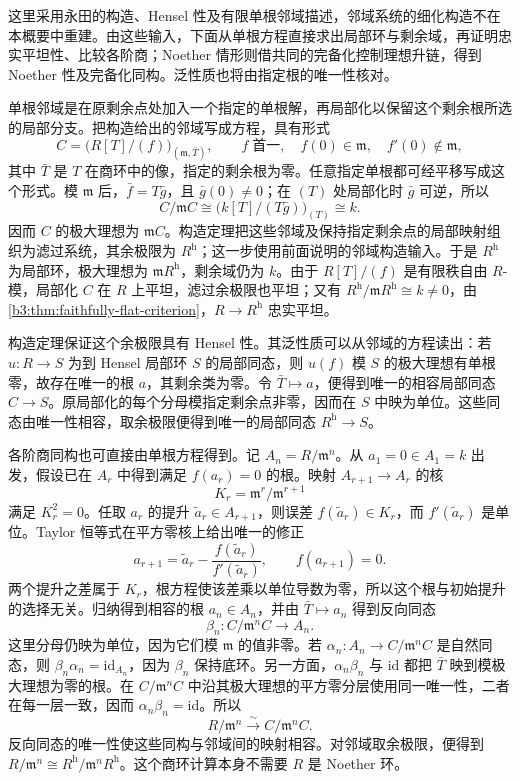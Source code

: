 \begin{proofsketch}
	这里采用永田的构造、Hensel 性及有限单根邻域描述，邻域系统的细化构造不在本概要中重建。由这些输入，下面从单根方程直接求出局部环与剩余域，再证明忠实平坦性、比较各阶商；Noether 情形则借共同的完备化控制理想升链，得到 Noether 性及完备化同构。泛性质也将由指定根的唯一性核对。

	单根邻域是在原剩余点处加入一个指定的单根解，再局部化以保留这个剩余根所选的局部分支。把构造给出的邻域写成方程，具有形式
	\[
		C=\bigl(R[T]/(f)\bigr)_{(\mathfrak m,\bar T)}, \qquad f\;\text{首一},\quad f(0)\in\mathfrak m, \quad f'(0)\notin\mathfrak m,
	\]
	其中 \(\bar T\) 是 \(T\) 在商环中的像，指定的剩余根为零。任意指定单根都可经平移写成这个形式。模 \(\mathfrak m\) 后，\(\bar f=T\bar g\)，且 \(\bar g(0)\ne0\)；在 \((T)\) 处局部化时 \(\bar g\) 可逆，所以
	\[
		C/\mathfrak mC\cong \bigl(k[T]/(T\bar g)\bigr)_{(T)}\cong k.
	\]
	因而 \(C\) 的极大理想为 \(\mathfrak mC\)。构造定理把这些邻域及保持指定剩余点的局部映射组织为滤过系统，其余极限为 \(R^{\mathrm h}\)；这一步使用前面说明的邻域构造输入。于是 \(R^{\mathrm h}\) 为局部环，极大理想为 \(\mathfrak mR^{\mathrm h}\)，剩余域仍为 \(k\)。由于 \(R[T]/(f)\) 是有限秩自由 \(R\)-模，局部化 \(C\) 在 \(R\) 上平坦，滤过余极限也平坦；又有 \(R^{\mathrm h}/\mathfrak mR^{\mathrm h}\cong k\ne0\)，由\cref{b3:thm:faithfully-flat-criterion}，\(R\to R^{\mathrm h}\) 忠实平坦。

	构造定理保证这个余极限具有 Hensel 性。其泛性质可以从邻域的方程读出：若 \(u:R\to S\) 为到 Hensel 局部环 \(S\) 的局部同态，则 \(u(f)\) 模 \(S\) 的极大理想有单根零，故存在唯一的根 \(a\)，其剩余类为零。令 \(\bar T\mapsto a\)，便得到唯一的相容局部同态 \(C\to S\)。原局部化的每个分母模指定剩余点非零，因而在 \(S\) 中映为单位。这些同态由唯一性相容，取余极限便得到唯一的局部同态 \(R^{\mathrm h}\to S\)。

	各阶商同构也可直接由单根方程得到。记 \(A_n=R/\mathfrak m^n\)。从 \(a_1=0\in A_1=k\) 出发，假设已在 \(A_r\) 中得到满足 \(f(a_r)=0\) 的根。映射 \(A_{r+1}\to A_r\) 的核
	\[
		K_r=\mathfrak m^r/\mathfrak m^{r+1}
	\]
	满足 \(K_r^2=0\)。任取 \(a_r\) 的提升 \(\tilde a_r\in A_{r+1}\)，则误差 \(f(\tilde a_r)\in K_r\)，而 \(f'(\tilde a_r)\) 是单位。Taylor 恒等式在平方零核上给出唯一的修正
	\[
		a_{r+1}=\tilde a_r- \dfrac{f(\tilde a_r)}{f'(\tilde a_r)}, \qquad f(a_{r+1})=0.
	\]
	两个提升之差属于 \(K_r\)，根方程使该差乘以单位导数为零，所以这个根与初始提升的选择无关。归纳得到相容的根 \(a_n\in A_n\)，并由 \(\bar T\mapsto a_n\) 得到反向同态
	\[
		\beta_n:C/\mathfrak m^nC\longrightarrow A_n.
	\]
	这里分母仍映为单位，因为它们模 \(\mathfrak m\) 的值非零。若 \(\alpha_n:A_n\to C/\mathfrak m^nC\) 是自然同态，则 \(\beta_n\alpha_n=\mathrm{id}_{A_n}\)，因为 \(\beta_n\) 保持底环。另一方面，\(\alpha_n\beta_n\) 与 \(\mathrm{id}\) 都把 \(\bar T\) 映到模极大理想为零的根。在 \(C/\mathfrak m^nC\) 中沿其极大理想的平方零分层使用同一唯一性，二者在每一层一致，因而 \(\alpha_n\beta_n=\mathrm{id}\)。所以
	\[
		R/\mathfrak m^n\xrightarrow{\sim}C/\mathfrak m^nC.
	\]
	反向同态的唯一性使这些同构与邻域间的映射相容。对邻域取余极限，便得到 \(R/\mathfrak m^n\cong R^{\mathrm h}/\mathfrak m^nR^{\mathrm h}\)。这个商环计算本身不需要 \(R\) 是 Noether 环。


\end{proofsketch}
